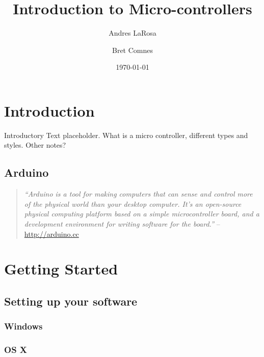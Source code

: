 \documentclass[11pt,a4paper]{article}
\begin{document}
\title{Introduction to Micro-controllers}
\date{\today} 
\author{Andres LaRosa}
\author{Bret Comnes}
\maketitle

\section{Introduction} %
\label{sec:introduction}

Introductory Text placeholder.  What is a micro controller, different types and styles.   Other notes?

\subsection{Arduino} %
\label{sub:arduino}

\begin{quote}
\emph{``Arduino is a tool for making computers that can sense and control more of the physical world than your desktop computer. It's an open-source physical computing platform based on a simple microcontroller board, and a development environment for writing software for the board.''} -- \url{http://arduino.cc}
\end{quote}




\section{Getting Started} %
\label{sec:getting_started}

\subsection{Setting up your software} %
\label{sub:setting_up_your_software}

\subsubsection{Windows} %
\label{ssub:windows}


\subsubsection{OS X} %
\label{ssub:os_x}
\end{document}
